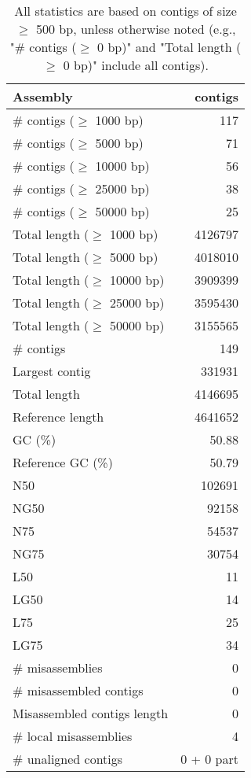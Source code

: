 \documentclass[12pt,a4paper]{article}
\begin{document}
\begin{table}[ht]
\begin{center}
\caption{All statistics are based on contigs of size $\geq$ 500 bp, unless otherwise noted (e.g., "\# contigs ($\geq$ 0 bp)" and "Total length ($\geq$ 0 bp)" include all contigs).}
\begin{tabular}{|l*{1}{|r}|}
\hline
Assembly & contigs \\ \hline
\# contigs ($\geq$ 1000 bp) & 117 \\ \hline
\# contigs ($\geq$ 5000 bp) & 71 \\ \hline
\# contigs ($\geq$ 10000 bp) & 56 \\ \hline
\# contigs ($\geq$ 25000 bp) & 38 \\ \hline
\# contigs ($\geq$ 50000 bp) & 25 \\ \hline
Total length ($\geq$ 1000 bp) & 4126797 \\ \hline
Total length ($\geq$ 5000 bp) & 4018010 \\ \hline
Total length ($\geq$ 10000 bp) & 3909399 \\ \hline
Total length ($\geq$ 25000 bp) & 3595430 \\ \hline
Total length ($\geq$ 50000 bp) & 3155565 \\ \hline
\# contigs & 149 \\ \hline
Largest contig & 331931 \\ \hline
Total length & 4146695 \\ \hline
Reference length & 4641652 \\ \hline
GC (\%) & 50.88 \\ \hline
Reference GC (\%) & 50.79 \\ \hline
N50 & 102691 \\ \hline
NG50 & 92158 \\ \hline
N75 & 54537 \\ \hline
NG75 & 30754 \\ \hline
L50 & 11 \\ \hline
LG50 & 14 \\ \hline
L75 & 25 \\ \hline
LG75 & 34 \\ \hline
\# misassemblies & 0 \\ \hline
\# misassembled contigs & 0 \\ \hline
Misassembled contigs length & 0 \\ \hline
\# local misassemblies & 4 \\ \hline
\# unaligned contigs & 0 + 0 part \\ \hline

\end{tabular}
\end{center}
\end{table}
\end{document}
